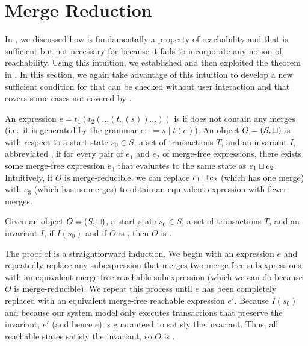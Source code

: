 \section{Merge Reduction}
In , we discussed how \invariantclosure{} is
fundamentally a property of reachability and that \invariantclosure{} is
sufficient but not necessary for \invariantconfluence{} because it fails to
incorporate any notion of reachability. Using this intuition, we established
 and then exploited the theorem in
. In this section, we again take
advantage of this intuition to develop a new sufficient condition for
\invariantconfluence{} that can be checked without user interaction and that
covers some cases not covered by \invariantclosure{}.

An expression $e = t_1(t_2(\ldots(t_n(s))\ldots))$ is  if
does not contain any merges (i.e.\ it is generated by the grammar $e ::= s \mid
t(e)$). An object $O = (S, \sqcup)$ is  with respect to
a start state $s_0 \in S$, a set of transactions $T$, and an invariant $I$,
abbreviated , if for every pair of $e_1$ and $e_2$
of merge-free \sTIreachable{} expressions, there exists some merge-free
\sTIreachable{} expression $e_3$ that evaluates to the same state as $e_1
\sqcup e_2$. Intuitively, if $O$ is merge-reducible, we can replace $e_1 \sqcup
e_2$ (which has one merge) with $e_3$ (which has no merges) to obtain an
equivalent expression with fewer merges.

\begin{theorem}
  Given an object $O = (S, \sqcup)$, a start state $s_0 \in S$, a set of
  transactions $T$, and an invariant $I$, if $I(s_0)$ and if $O$ is
  \sTImergereducible{}, then $O$ is \sTIconfluent{}.
\end{theorem}

The proof of  is a straightforward
induction. We begin with an \sTIreachable{} expression $e$ and repeatedly
replace any subexpression that merges two merge-free subexpressions with an
equivalent merge-free reachable subexpression (which we can do because $O$ is
merge-reducible). We repeat this process until $e$ has been completely replaced
with an equivalent merge-free reachable expression $e'$. Because $I(s_0)$ and
because our system model only executes transactions that preserve the
invariant, $e'$ (and hence $e$) is guaranteed to satisfy the invariant. Thus,
all reachable states satisfy the invariant, so $O$ is \invariantconfluent{}.

